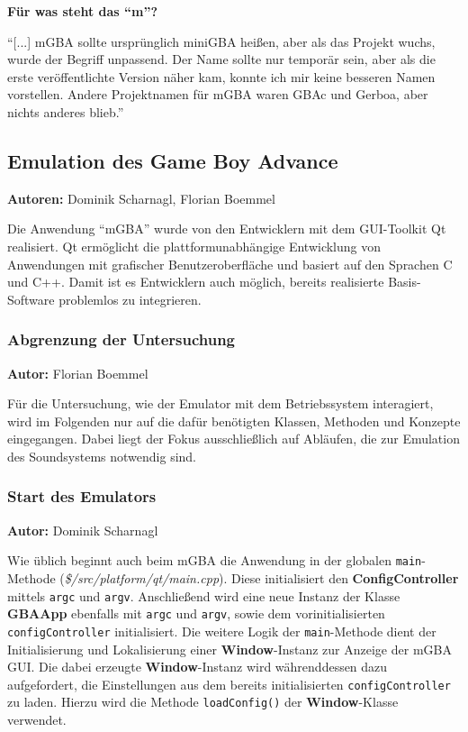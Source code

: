 \documentclass[11pt,a4paper]{scrartcl}
\newcommand{\AutorDominik} {
    \vspace{-4mm}
    \large \textbf{Autor:} Dominik Scharnagl \normalsize
    \vspace{2mm}
}
\newcommand{\AutorDominikFlorian} {
    \vspace{-4mm}
    \large \textbf{Autoren:} Dominik Scharnagl, Florian Boemmel \normalsize
    \vspace{2mm}
}
\newcommand{\AutorFlorian} {
    \vspace{-4mm}
    \large \textbf{Autor:} Florian Boemmel \normalsize
    \vspace{2mm}
}
\newcommand{\paratitle}[1] {
    \vspace{5mm}
    \large \textbf{#1} \normalsize
    \vspace{2mm}\newline
}
\begin{document}
\paratitle{F\"ur was steht das \enquote{m}?}
\enquote{[...] mGBA sollte urspr\"unglich miniGBA hei{\ss}en, aber als das Projekt wuchs, wurde der Begriff unpassend. Der Name sollte nur tempor\"ar sein, aber als die erste ver\"offentlichte Version n\"aher kam, konnte ich mir keine besseren Namen vorstellen. Andere Projektnamen f\"ur mGBA waren GBAc und Gerboa, aber nichts anderes blieb.} \cite{mGBAFaq}



\subsection{Emulation des Game Boy Advance} \label{EmulationGameBoyAdvance}
\AutorDominikFlorian

Die Anwendung \enquote{mGBA} wurde von den Entwicklern mit dem GUI-Toolkit Qt realisiert. Qt erm\"oglicht die plattformunabh\"angige Entwicklung von Anwendungen mit grafischer Benutzeroberfl\"ache und basiert auf den Sprachen C und C++. Damit ist es Entwicklern auch m\"oglich, bereits realisierte Basis-Software problemlos zu integrieren.


\subsubsection{Abgrenzung der Untersuchung}
\AutorFlorian

F\"ur die Untersuchung, wie der Emulator mit dem Betriebssystem interagiert, wird im Folgenden nur auf die daf\"ur ben\"otigten Klassen, Methoden und Konzepte eingegangen. Dabei liegt der Fokus ausschlie{\ss}lich auf Abl\"aufen, die zur Emulation des Soundsystems notwendig sind.

\newpage
\subsubsection{Start des Emulators} \label{Emulator_Start}
\AutorDominik

Wie \"ublich beginnt auch beim mGBA die Anwendung in der globalen \verb|main|-Methode (\textit{\$/src/platform/qt/main.cpp}). Diese initialisiert den \textbf{ConfigController} mittels \verb|argc| und \verb|argv|. Anschlie{\ss}end wird eine neue Instanz der Klasse \textbf{GBAApp} ebenfalls mit \verb|argc| und \verb|argv|, sowie dem vorinitialisierten \verb|configController| initialisiert. Die weitere Logik der \verb|main|-Methode dient der Initialisierung und Lokalisierung einer \textbf{Window}-Instanz zur Anzeige der mGBA GUI. Die dabei erzeugte \textbf{Window}-Instanz wird w\"ahrenddessen dazu aufgefordert, die Einstellungen aus dem bereits initialisierten \verb|configController| zu laden. Hierzu wird die Methode \verb|loadConfig()| der \textbf{Window}-Klasse verwendet.
\end{document}
